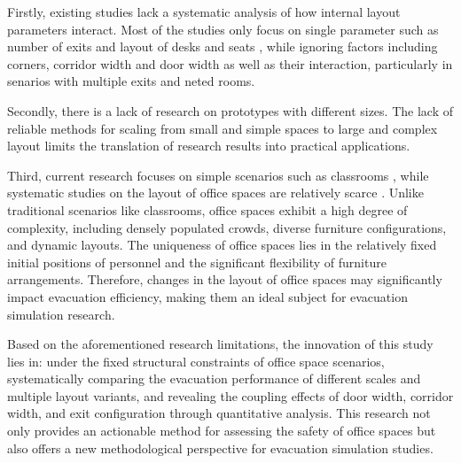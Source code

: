 Firstly, existing studies lack a systematic analysis of how internal layout parameters interact. Most of the studies only focus on single parameter such as number of exits and layout of desks and seats \cite{liuEvaluatingClassroomEvacuation,gustavssonEvaluatingImpactTable2022}, while ignoring factors including corners, corridor width and door width as well as their interaction, particularly in senarios with multiple exits and neted rooms.

Secondly, there is a lack of research on prototypes with different sizes. The lack of reliable methods for scaling from small and simple spaces to large and complex layout limits the translation of research results into practical applications.

Third, current research focuses on simple scenarios such as classrooms \cite{liuEvaluatingClassroomEvacuation,gustavssonEvaluatingImpactTable2022}, while systematic studies on the layout of office spaces are relatively scarce \cite{katoOfficeLayoutPlan2010}. Unlike traditional scenarios like classrooms, office spaces exhibit a high degree of complexity, including densely populated crowds, diverse furniture configurations, and dynamic layouts. The uniqueness of office spaces lies in the relatively fixed initial positions of personnel and the significant flexibility of furniture arrangements. Therefore, changes in the layout of office spaces may significantly impact evacuation efficiency, making them an ideal subject for evacuation simulation research.

Based on the aforementioned research limitations, the innovation of this study lies in: under the fixed structural constraints of office space scenarios, systematically comparing the evacuation performance of different scales and multiple layout variants, and revealing the coupling effects of door width, corridor width, and exit configuration through quantitative analysis. This research not only provides an actionable method for assessing the safety of office spaces but also offers a new methodological perspective for evacuation simulation studies.